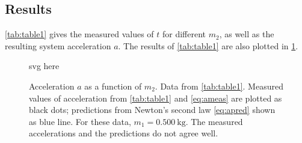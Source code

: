 ﻿\documentclass[reprint,amsmath,amssymb,aps]{revtex4-2}
\begin{document}
%






\subsection{Results}
\cref{tab:table1} gives the measured values of $t$ for different $m_2$, as well as the resulting system acceleration $a$. The results of \cref{tab:table1} are also plotted in \cref{fig:fig1}.

\begin{figure}
\begin{center}
svg here
\end{center}
\caption{\label{fig:fig1} Acceleration $a$ as a function of $m_2$. Data from \cref{tab:table1}. Measured values of acceleration from \cref{tab:table1} and \cref{eq:ameas} are plotted as black dots; predictions from Newton's second law \cref{eq:apred} shown as blue line. For these data, $m_1=\qty{0.500}{\kilo\gram}$. The measured accelerations and the predictions do not agree well.} 
\end{figure}
%
\end{document}
